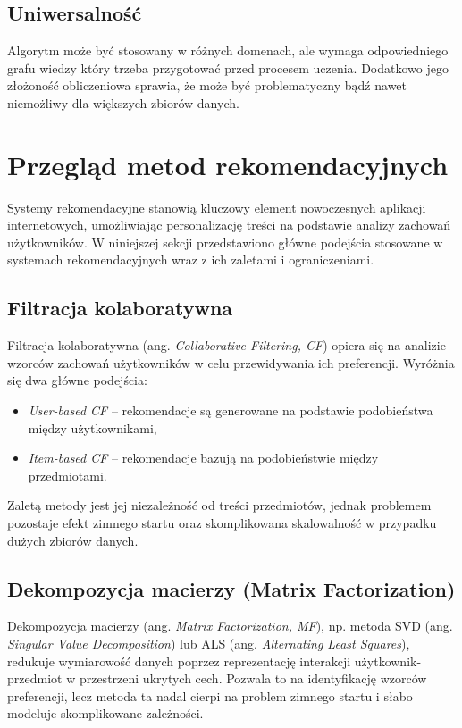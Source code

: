 \documentclass[a4paper]{LTJournalArticle}
\begin{document}
\subsection{Uniwersalność}
Algorytm może być stosowany w różnych domenach, ale wymaga odpowiedniego grafu wiedzy który trzeba przygotować przed procesem uczenia. Dodatkowo jego 
złożoność obliczeniowa sprawia, że może być problematyczny bądź nawet niemożliwy dla większych zbiorów danych.
	
\section{Przegląd metod rekomendacyjnych}

Systemy rekomendacyjne stanowią kluczowy element nowoczesnych aplikacji internetowych, umożliwiając personalizację treści na podstawie analizy zachowań użytkowników. W niniejszej sekcji przedstawiono główne podejścia stosowane w systemach rekomendacyjnych wraz z ich zaletami i ograniczeniami.

\subsection{Filtracja kolaboratywna}
Filtracja kolaboratywna (ang. \textit{Collaborative Filtering, CF}) opiera się na analizie wzorców zachowań użytkowników w celu przewidywania ich preferencji. Wyróżnia się dwa główne podejścia:
\begin{itemize}
	\item \textit{User-based CF} – rekomendacje są generowane na podstawie podobieństwa między użytkownikami,
	\item \textit{Item-based CF} – rekomendacje bazują na podobieństwie między przedmiotami.
\end{itemize}
Zaletą metody jest jej niezależność od treści przedmiotów, jednak problemem pozostaje efekt zimnego startu oraz skomplikowana skalowalność w przypadku dużych zbiorów danych.

\subsection{Dekompozycja macierzy (Matrix Factorization)}
Dekompozycja macierzy (ang. \textit{Matrix Factorization, MF}), np. metoda SVD (ang. \textit{Singular Value Decomposition}) lub ALS (ang. \textit{Alternating Least Squares}), redukuje wymiarowość danych poprzez reprezentację interakcji użytkownik-przedmiot w przestrzeni ukrytych cech. Pozwala to na identyfikację wzorców preferencji, lecz metoda ta nadal cierpi na problem zimnego startu i słabo modeluje skomplikowane zależności.
\end{document}
